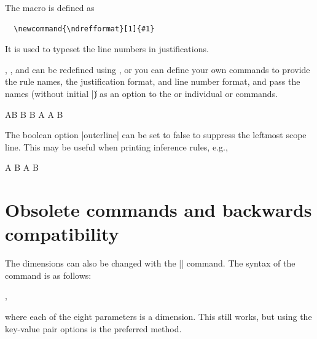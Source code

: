 \documentclass{ltxdoc}
\begin{document}
\DescribeMacro{\ndrefformat}
The macro \cmd{\ndrefformat} is defined as
\begin{verbatim}
  \newcommand{\ndrefformat}[1]{#1}
\end{verbatim}
It is used to typeset the line numbers in justifications.

\cmd{\ndrules}, \cmd{\ndjustformat}, and \cmd{\ndrefformat} can
be redefined using \cmd{\renewcommand}, or you can define your own
commands to provide the rule names, the justification format, and line
number format, and pass the names (without initial |\|) as an option
to the \cmd{\usepackage} or individual \cmd{\nd} or \cmd{\fitchproof}
commands.
\begin{LTXexample}
\newcommand{\myjust}[2]
  {#2 by \textsf{#1}}
\newcommand{\myrules}{
  \ndrules %
  \def\ds{\by{DS}}}
\renewcommand{\ndrefformat}[1]{(#1)}
\begin{fitchproof}[rules=myrules,
  justformat=myjust,
  indent=1.5cm,
  linethickness=1.5pt,
  justsep=1cm]
   {A\vee B}
   {\neg B}
  \open
   {B}
   {A}          
   {A \wedge B} 
\end{fitchproof}
\end{LTXexample}

The boolean option |outerline| can be set to false to suppress the
leftmost scope line. This may be useful when printing inference rules,
e.g.,
\begin{LTXexample}
\begin{fitchproof}[outerline=false,
  labelsep=0pt]
  \open
   {A}
   {\raisebox{-1ex}{\vdots}}
   {B}
  \close
   {A \Rightarrow B} 
\end{fitchproof}
\end{LTXexample}

\section{Obsolete commands and backwards compatibility}\label{compat}

\DescribeMacro{\nddim}
The dimensions can also be changed with the
|\nddim| command. The syntax of the command is as follows:
\begin{center}
  \cmd{\nddim}
  ,
\end{center}
where each of the eight parameters is a dimension. This still works,
but using the key-value pair options is the preferred method.
\end{document}

